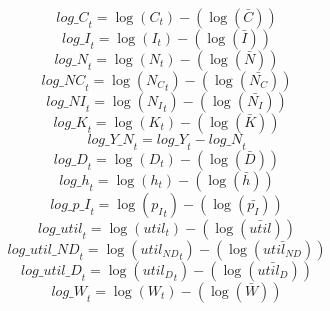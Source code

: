 \begin{dmath}
{log\_C}_{t}=\log\left({{C}}_{t}\right)-(\log\left(\bar{{C}}\right))
\end{dmath}
\begin{dmath}
{log\_I}_{t}=\log\left({{I}}_{t}\right)-(\log\left(\bar{{I}}\right))
\end{dmath}
\begin{dmath}
{log\_N}_{t}=\log\left({{N}}_{t}\right)-(\log\left(\bar{{N}}\right))
\end{dmath}
\begin{dmath}
{log\_NC}_{t}=\log\left({{N_C}}_{t}\right)-(\log\left(\bar{{N_C}}\right))
\end{dmath}
\begin{dmath}
{log\_NI}_{t}=\log\left({{N_I}}_{t}\right)-(\log\left(\bar{{N_I}}\right))
\end{dmath}
\begin{dmath}
{log\_K}_{t}=\log\left({{K}}_{t}\right)-(\log\left(\bar{{K}}\right))
\end{dmath}
\begin{dmath}
{log\_Y\_N}_{t}={log\_Y}_{t}-{log\_N}_{t}
\end{dmath}
\begin{dmath}
{log\_D}_{t}=\log\left({{D}}_{t}\right)-(\log\left(\bar{{D}}\right))
\end{dmath}
\begin{dmath}
{log\_h}_{t}=\log\left({h}_{t}\right)-(\log\left(\bar{h}\right))
\end{dmath}
\begin{dmath}
{log\_p\_I}_{t}=\log\left({{p_I}}_{t}\right)-(\log\left(\bar{{p_I}}\right))
\end{dmath}
\begin{dmath}
{log\_util}_{t}=\log\left({{util}}_{t}\right)-(\log\left(\bar{{util}}\right))
\end{dmath}
\begin{dmath}
{log\_util\_ND}_{t}=\log\left({{util_{ND}}}_{t}\right)-(\log\left(\bar{{util_{ND}}}\right))
\end{dmath}
\begin{dmath}
{log\_util\_D}_{t}=\log\left({{util_D}}_{t}\right)-(\log\left(\bar{{util_D}}\right))
\end{dmath}
\begin{dmath}
{log\_W}_{t}=\log\left({{W}}_{t}\right)-(\log\left(\bar{{W}}\right))
\end{dmath}
